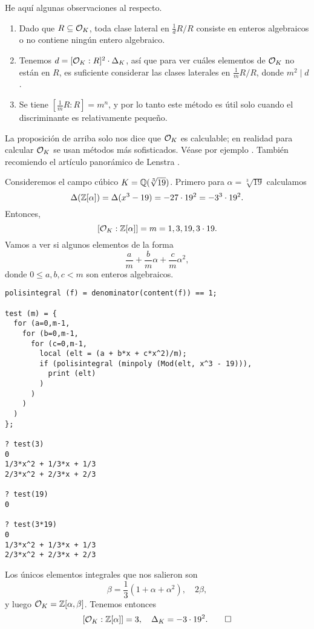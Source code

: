 \begin{comentario}
  He aquí algunas observaciones al respecto.

  \begin{enumerate}
  \item Dado que $R \subseteq \mathcal{O}_K$, toda clase lateral en $\frac{1}{d}R/R$
    consiste en enteros algebraicos o no contiene ningún entero algebraico.

  \item Tenemos $d = [\mathcal{O}_K : R]^2\cdot \Delta_K$, así que para ver cuáles
    elementos de $\mathcal{O}_K$ no están en $R$, es suficiente considerar las clases
    laterales en $\frac{1}{m}R/R$, donde $m^2 \mid d$.

  \item Se tiene $[\frac{1}{m}R : R] = m^n$, y por lo tanto este método es útil
    solo cuando el discriminante es relativamente pequeño.
  \end{enumerate}

  La proposición de arriba solo nos dice que $\mathcal{O}_K$ es calculable; en realidad
  para calcular $\mathcal{O}_K$ se usan métodos más sofisticados. Véase por ejemplo
  \cite[\S 6.1]{Cohen-GTM138}. También recomiendo el artículo panorámico
  de Lenstra \cite{Lenstra-1992}.
\end{comentario}

\begin{ejemplo}
  \label{ejemplo:raiz-cubica-de-19}
  Consideremos el campo cúbico $K = \mathbb{Q} (\sqrt[3]{19})$. Primero para
  $\alpha = \sqrt[3]{19}$ calculamos
  \[ \Delta (\mathbb{Z} [\alpha]) = \Delta (x^3 - 19)
     = -27\cdot 19^2 = -3^3\cdot 19^2. \]
  Entonces,
  $$[\mathcal{O}_K : \mathbb{Z} [\alpha]] = m = 1, 3, 19, 3\cdot 19.$$
  Vamos a ver si algunos elementos de la forma
  $$\frac{a}{m} + \frac{b}{m}\alpha + \frac{c}{m}\alpha^2,$$
  donde $0 \le a,b,c < m$ son enteros algebraicos.

\begin{shaded}
\begin{verbatim}
polisintegral (f) = denominator(content(f)) == 1;

test (m) = {
  for (a=0,m-1,
    for (b=0,m-1,
      for (c=0,m-1,
        local (elt = (a + b*x + c*x^2)/m);
        if (polisintegral (minpoly (Mod(elt, x^3 - 19))),
          print (elt)
        )
      )
    )
  )
};

? test(3)
0
1/3*x^2 + 1/3*x + 1/3
2/3*x^2 + 2/3*x + 2/3

? test(19)
0

? test(3*19)
0
1/3*x^2 + 1/3*x + 1/3
2/3*x^2 + 2/3*x + 2/3
\end{verbatim}
\end{shaded}
  Los únicos elementos integrales que nos salieron son
  $$\beta = \frac{1}{3} (1 + \alpha + \alpha^2), \quad 2\beta,$$
  y luego $\mathcal{O}_K = \mathbb{Z} [\alpha,\beta]$. Tenemos entonces
  \[ [\mathcal{O}_K : \mathbb{Z} [\alpha]] = 3, \quad \Delta_K = -3\cdot 19^2. \qedhere \]
\end{ejemplo}

